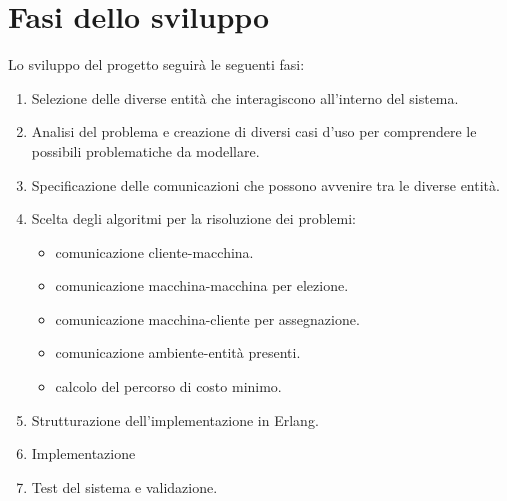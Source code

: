 \section{Fasi dello sviluppo}
Lo sviluppo del progetto seguirà le seguenti fasi:
\begin{enumerate}
	\item Selezione delle diverse entità che interagiscono all'interno del sistema.
	\item Analisi del problema e creazione di diversi casi d'uso per comprendere le possibili problematiche da modellare.
	\item Specificazione delle comunicazioni che possono avvenire tra le diverse entità.
	\item Scelta degli algoritmi per la risoluzione dei problemi: 
		\begin{itemize}
			\item comunicazione cliente-macchina.
			\item comunicazione macchina-macchina per elezione.
			\item comunicazione macchina-cliente per assegnazione.
			\item comunicazione ambiente-entità presenti.
			\item calcolo del percorso di costo minimo.
		\end{itemize}
	\item Strutturazione dell'implementazione in Erlang.
	\item Implementazione
	\item Test del sistema e validazione.
\end{enumerate}

